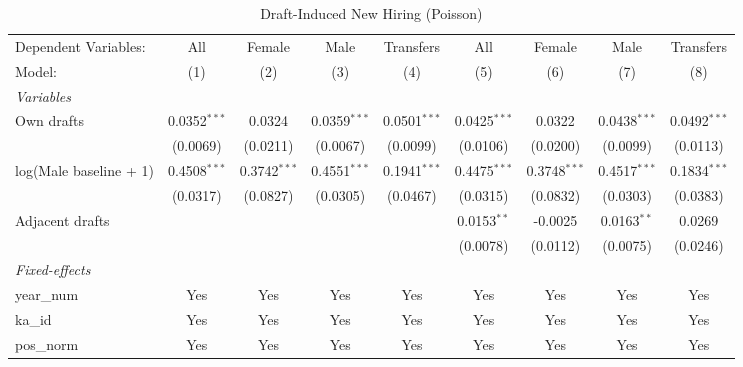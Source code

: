 \begin{table}[htbp]
\centering
\caption{Draft-Induced New Hiring (Poisson)}
\label{tab:draft-hiring}
\small
\begin{threeparttable}
\begingroup
\centering
\begin{tabular}{lcccccccc}
   \tabularnewline \midrule \midrule
   Dependent Variables:   & All            & Female         & Male           & Transfers      & All            & Female         & Male           & Transfers\\  
   Model:                 & (1)            & (2)            & (3)            & (4)            & (5)            & (6)            & (7)            & (8)\\  
   \midrule
   \emph{Variables}\\
   Own drafts             & 0.0352$^{***}$ & 0.0324         & 0.0359$^{***}$ & 0.0501$^{***}$ & 0.0425$^{***}$ & 0.0322         & 0.0438$^{***}$ & 0.0492$^{***}$\\   
                          & (0.0069)       & (0.0211)       & (0.0067)       & (0.0099)       & (0.0106)       & (0.0200)       & (0.0099)       & (0.0113)\\   
   log(Male baseline + 1) & 0.4508$^{***}$ & 0.3742$^{***}$ & 0.4551$^{***}$ & 0.1941$^{***}$ & 0.4475$^{***}$ & 0.3748$^{***}$ & 0.4517$^{***}$ & 0.1834$^{***}$\\   
                          & (0.0317)       & (0.0827)       & (0.0305)       & (0.0467)       & (0.0315)       & (0.0832)       & (0.0303)       & (0.0383)\\   
   Adjacent drafts        &                &                &                &                & 0.0153$^{**}$  & -0.0025        & 0.0163$^{**}$  & 0.0269\\   
                          &                &                &                &                & (0.0078)       & (0.0112)       & (0.0075)       & (0.0246)\\   
   \midrule
   \emph{Fixed-effects}\\
   year\_num              & Yes            & Yes            & Yes            & Yes            & Yes            & Yes            & Yes            & Yes\\  
   ka\_id                 & Yes            & Yes            & Yes            & Yes            & Yes            & Yes            & Yes            & Yes\\  
   pos\_norm              & Yes            & Yes            & Yes            & Yes            & Yes            & Yes            & Yes            & Yes\\  

\end{tabular}
\end{threeparttable}
\end{table}
